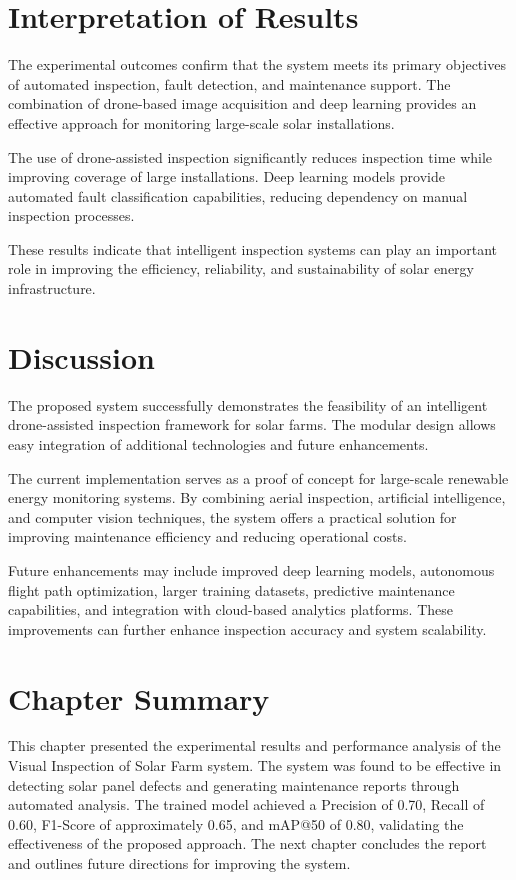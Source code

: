\section{Interpretation of Results}

The experimental outcomes confirm that the system meets its primary objectives of automated inspection, fault detection, and maintenance support. The combination of drone-based image acquisition and deep learning provides an effective approach for monitoring large-scale solar installations.

The use of drone-assisted inspection significantly reduces inspection time while improving coverage of large installations. Deep learning models provide automated fault classification capabilities, reducing dependency on manual inspection processes.

These results indicate that intelligent inspection systems can play an important role in improving the efficiency, reliability, and sustainability of solar energy infrastructure.

\section{Discussion}

The proposed system successfully demonstrates the feasibility of an intelligent drone-assisted inspection framework for solar farms. The modular design allows easy integration of additional technologies and future enhancements.

The current implementation serves as a proof of concept for large-scale renewable energy monitoring systems. By combining aerial inspection, artificial intelligence, and computer vision techniques, the system offers a practical solution for improving maintenance efficiency and reducing operational costs.

Future enhancements may include improved deep learning models, autonomous flight path optimization, larger training datasets, predictive maintenance capabilities, and integration with cloud-based analytics platforms. These improvements can further enhance inspection accuracy and system scalability.

\section{Chapter Summary}

This chapter presented the experimental results and performance analysis of the Visual Inspection of Solar Farm system. The system was found to be effective in detecting solar panel defects and generating maintenance reports through automated analysis. The trained model achieved a Precision of 0.70, Recall of 0.60, F1-Score of approximately 0.65, and mAP@50 of 0.80, validating the effectiveness of the proposed approach. The next chapter concludes the report and outlines future directions for improving the system.

